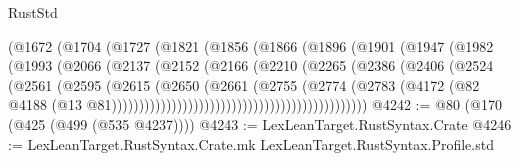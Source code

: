 \begin{lexlean}{RustStd}
\begin{coremodule}
                                    (@1672
                                      (@1704
                                        (@1727
                                          (@1821
                                            (@1856
                                              (@1866
                                                (@1896
                                                  (@1901
                                                    (@1947
                                                      (@1982
                                                        (@1993
                                                          (@2066
                                                            (@2137
                                                              (@2152
                                                                (@2166
                                                                  (@2210
                                                                    (@2265
                                                                      (@2386
                                                                        (@2406
                                                                          (@2524
                                                                            (@2561
                                                                              (@2595
                                                                                (@2615
                                                                                  (@2650
                                                                                    (@2661
                                                                                      (@2755
                                                                                        (@2774
                                                                                          (@2783
                                                                                            (@4172
                                                                                              (@82
                                                                                                @4188
                                                                                                (@13
                                                                                                  @81)))))))))))))))))))))))))))))))))))))))))))))))
@4242 := @80 (@170 (@425 (@499 (@535 @4237))))
@4243 := LexLeanTarget.RustSyntax.Crate
@4246 := LexLeanTarget.RustSyntax.Crate.mk LexLeanTarget.RustSyntax.Profile.std

\end{coremodule}
\end{lexlean}
